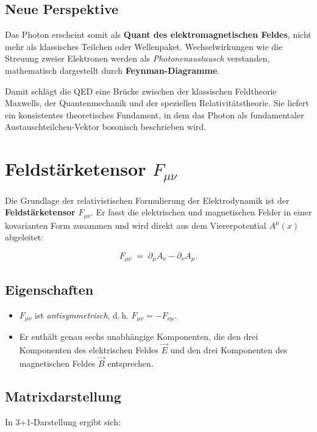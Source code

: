 \subsection*{Neue Perspektive}
Das Photon erscheint somit als \textbf{Quant des elektromagnetischen Feldes}, 
nicht mehr als klassisches Teilchen oder Wellenpaket. 
Wechselwirkungen wie die Streuung zweier Elektronen werden als 
\emph{Photonenaustausch} verstanden, mathematisch dargestellt 
durch \textbf{Feynman-Diagramme}. 

\medskip
Damit schlägt die QED eine Brücke zwischen der klassischen Feldtheorie Maxwells, 
der Quantenmechanik und der speziellen Relativitätstheorie. 
Sie liefert ein konsistentes theoretisches Fundament, in dem das Photon 
als fundamentaler Austauschteilchen-Vektor bosonisch beschrieben wird.

\section{Feldstärketensor \(F_{\mu\nu}\)}

\label{anhangA:feldstaerketensor}

Die Grundlage der relativistischen Formulierung der Elektrodynamik
ist der \textbf{Feldstärketensor} \( F_{\mu\nu} \).
Er fasst die elektrischen und magnetischen Felder in einer 
kovarianten Form zusammen und wird direkt aus dem Viererpotential 
\( A^\mu(x) \) abgeleitet:

\[
F_{\mu\nu} \;=\; \partial_\mu A_\nu - \partial_\nu A_\mu .
\]

\subsection*{Eigenschaften}
\begin{itemize}
	\item \( F_{\mu\nu} \) ist \emph{antisymmetrisch}, d.\,h. 
	\( F_{\mu\nu} = - F_{\nu\mu} \).  
	\item Er enthält genau sechs unabhängige Komponenten, 
	die den drei Komponenten des elektrischen Feldes \( \vec{E} \) 
	und den drei Komponenten des magnetischen Feldes \( \vec{B} \) entsprechen.
\end{itemize}

\subsection*{Matrixdarstellung}
In 3+1-Darstellung ergibt sich:

